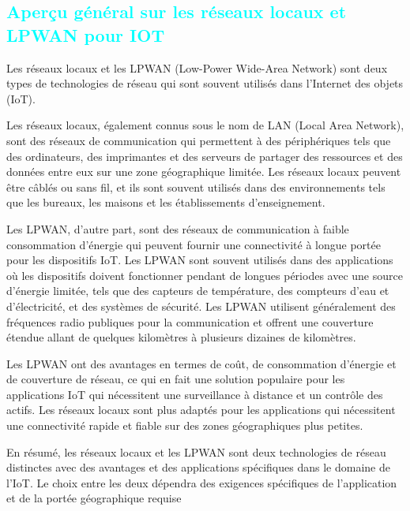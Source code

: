 \begin{flushleft}
	\section{\textcolor{cyan}{Aperçu général sur les réseaux locaux et LPWAN pour IOT}}
	Les réseaux locaux et les LPWAN (Low-Power Wide-Area Network) sont deux types de technologies de réseau qui sont souvent utilisés dans l'Internet des objets (IoT).
	
	Les réseaux locaux, également connus sous le nom de LAN (Local Area Network), sont des réseaux de communication qui permettent à des périphériques tels que des ordinateurs, des imprimantes et des serveurs de partager des ressources et des données entre eux sur une zone géographique limitée. Les réseaux locaux peuvent être câblés ou sans fil, et ils sont souvent utilisés dans des environnements tels que les bureaux, les maisons et les établissements d'enseignement.
	
	Les LPWAN, d'autre part, sont des réseaux de communication à faible consommation d'énergie qui peuvent fournir une connectivité à longue portée pour les dispositifs IoT. Les LPWAN sont souvent utilisés dans des applications où les dispositifs doivent fonctionner pendant de longues périodes avec une source d'énergie limitée, tels que des capteurs de température, des compteurs d'eau et d'électricité, et des systèmes de sécurité. Les LPWAN utilisent généralement des fréquences radio publiques pour la communication et offrent une couverture étendue allant de quelques kilomètres à plusieurs dizaines de kilomètres.
	
	Les LPWAN ont des avantages en termes de coût, de consommation d'énergie et de couverture de réseau, ce qui en fait une solution populaire pour les applications IoT qui nécessitent une surveillance à distance et un contrôle des actifs. Les réseaux locaux sont plus adaptés pour les applications qui nécessitent une connectivité rapide et fiable sur des zones géographiques plus petites.
	
	En résumé, les réseaux locaux et les LPWAN sont deux technologies de réseau distinctes avec des avantages et des applications spécifiques dans le domaine de l'IoT. Le choix entre les deux dépendra des exigences spécifiques de l'application et de la portée géographique requise

\end{flushleft}
